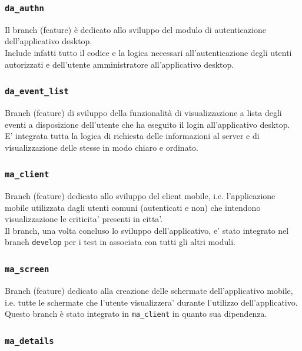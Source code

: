 \documentclass{article}
\begin{document}
\subsubsection{\texttt{da\_authn}}

Il branch (feature) è dedicato allo sviluppo del modulo di autenticazione dell'applicativo desktop.\\
Include infatti tutto il codice e la logica necessari all'autenticazione degli utenti autorizzati e dell'utente amministratore all'applicativo desktop.

\subsubsection{\texttt{da\_event\_list}}

Branch (feature) di sviluppo della funzionalità di visualizzazione a lista degli eventi a disposizione dell'utente che ha eseguito il login all'applicativo desktop.\\
E' integrata tutta la logica di richiesta delle informazioni al server e di visualizzazione delle stesse in modo chiaro e ordinato.

\subsubsection{\texttt{ma\_client}}

Branch (feature) dedicato allo sviluppo del client mobile, i.e. l'applicazione mobile utilizzata dagli utenti comuni (autenticati e non) che intendono visualizzazione le criticita' presenti in citta'.\\
Il branch, una volta concluso lo sviluppo dell'applicativo, e' stato integrato nel branch \texttt{develop} per i test in associata con tutti gli altri moduli.


\subsubsection{\texttt{ma\_screen}}

Branch (feature) dedicato alla creazione delle schermate dell'applicativo mobile, i.e. tutte le schermate che l'utente visualizzera' durante l'utilizzo dell'applicativo.\\
Questo branch è stato integrato in \texttt{ma\_client} in quanto sua dipendenza.

\subsubsection{\texttt{ma\_details}}
\end{document}
